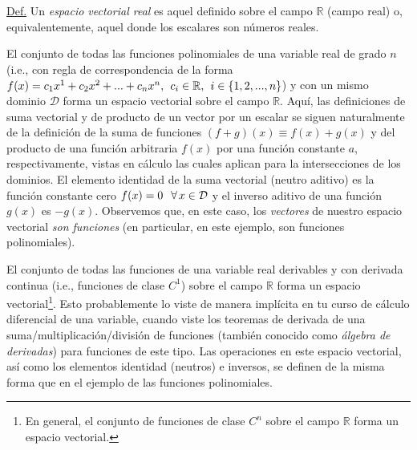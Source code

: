 \documentclass[apuntes]{subfiles}
\begin{document}
\vspace{1.5mm} 

\begin{tcolorbox}
\underline{Def.} Un \textit{espacio vectorial real} es aquel definido sobre el campo $\mathbb{R}$ (campo real) o, equivalentemente, aquel donde los escalares son números reales.
\end{tcolorbox}{}

El conjunto de todas las funciones polinomiales de una variable real de grado $n$ (i.e., con regla de correspondencia de la forma $f(x) = c_1 x^1 + c_2 x^2 + ... + c_n x^n, \hspace{1.5mm} c_i \in \mathbb{R}, \hspace{1.5mm} i \in \{1,2,...,n\}$) y con un mismo dominio $\mathcal{D}$ forma un espacio vectorial sobre el campo $\mathbb{R}$. Aquí, las definiciones de suma vectorial y de producto de un vector por un escalar se siguen naturalmente de la definición de la suma de funciones $(f+g)(x)\equiv f(x)+g(x)$ y del producto de una función arbitraria $f(x)$ por una función constante $a$, respectivamente, vistas en cálculo \textemdash las cuales aplican para la intersecciones de los dominios. El elemento identidad de la suma vectorial (neutro aditivo) es la función constante cero $f(x)=0\hspace{2.5mm} \forall\hspace{0.5mm}x\in\mathcal{D}$ y el inverso aditivo de una función $g(x)$ es $-g(x)$. Observemos que, en este caso, los \textit{vectores} de nuestro espacio vectorial \textit{son funciones} (en particular, en este ejemplo, son funciones polinomiales).

\vspace{3mm}

El conjunto de todas las funciones de una variable real derivables y con derivada continua (i.e., funciones de clase $C^1$) sobre el campo $\mathbb{R}$ forma un espacio vectorial\footnote{En general, el conjunto de funciones de clase $C^n$ sobre el campo $\mathbb{R}$ forma un espacio vectorial.}. Esto probablemente lo viste de manera implícita en tu curso de cálculo diferencial de una variable, cuando viste los teoremas de derivada de una suma/multiplicación/división de funciones (también conocido como \emph{álgebra de derivadas}) para funciones de este tipo. Las operaciones en este espacio vectorial, así como los elementos identidad (neutros) e inversos, se definen de la misma forma que en el ejemplo de las funciones polinomiales.

\vspace{3mm}
\end{document}
